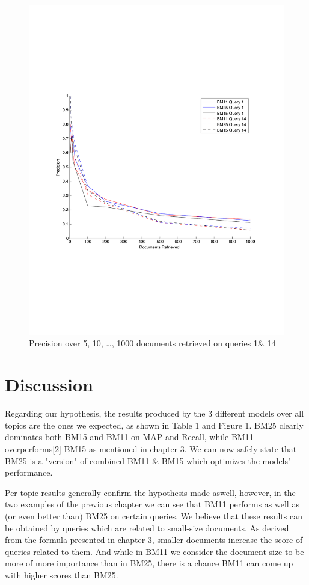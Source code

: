 \documentclass[letterpaper,11pt]{article}
\begin{document}
\begin{figure}[h]
\centering
\includegraphics[scale = 0.75]{dr2.pdf}
\caption{Precision over 5, 10, \dots, 1000 documents retrieved on queries 1\& 14}

\end{figure}

\newpage

\section{Discussion}
Regarding our hypothesis, the results produced by the 3 different models over all topics are the ones we expected, as shown in Table 1 and Figure 1. BM25 clearly dominates both BM15 and BM11 on MAP and Recall, while BM11 overperforms[2] BM15 as mentioned in chapter 3. We can now safely state that BM25 is a "version" of combined BM11 \& BM15 which optimizes the models' performance. 

Per-topic results generally confirm the hypothesis made aswell, however, in the two examples of the previous chapter we can see that BM11 performs as well as (or even better than) BM25 on certain queries. We believe that these results can be obtained by queries which are related to small-size documents. As derived from the formula presented in chapter 3, smaller documents increase the score of queries related to them. And while in BM11 we consider the document size to be more of more importance than in BM25, there is a chance BM11 can come up with higher scores than BM25.
\end{document}
